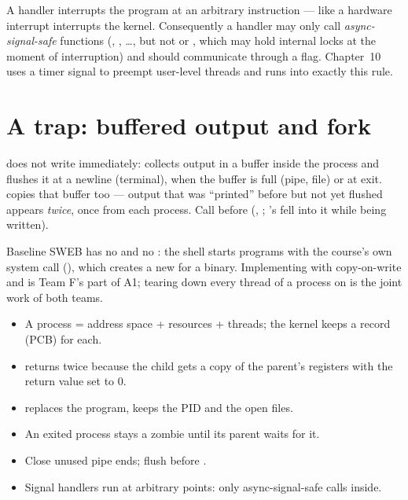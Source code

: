 A handler interrupts the program at an arbitrary instruction --- like a
hardware interrupt interrupts the kernel. Consequently a handler may only
call \emph{async-signal-safe} functions (, ,
\dots, but not  or , which may hold internal
locks at the moment of interruption) and should communicate through a
 flag. Chapter~10 uses a timer signal to
preempt user-level threads and runs into exactly this rule.

\section{A trap: buffered output and fork}

 does not write immediately:  collects output in
a buffer inside the process and flushes it at a newline (terminal),
when the buffer is full (pipe, file) or at exit.  copies that
buffer too --- output that was ``printed'' before  but not yet
flushed appears \emph{twice}, once from each process. Call
 before  (,
; 's  fell into it while
being written).

\begin{swebbox}
Baseline SWEB has no  and no : the shell starts
programs with the course's own  system call
(), which creates a new
 for a binary. Implementing  with
copy-on-write and  is Team F's part of A1; tearing down every
thread of a process on  is the joint work of both teams.
\end{swebbox}

\begin{keybox}
\begin{itemize}
  \item A process = address space + resources + threads; the kernel keeps
    a record (PCB) for each.
  \item {} returns twice because the child gets a copy of the
    parent's registers with the return value set to 0.
  \item {} replaces the program, keeps the PID and the open files.
  \item An exited process stays a zombie until its parent waits for it.
  \item Close unused pipe ends; flush  before .
  \item Signal handlers run at arbitrary points: only async-signal-safe
    calls inside.
\end{itemize}
\end{keybox}
